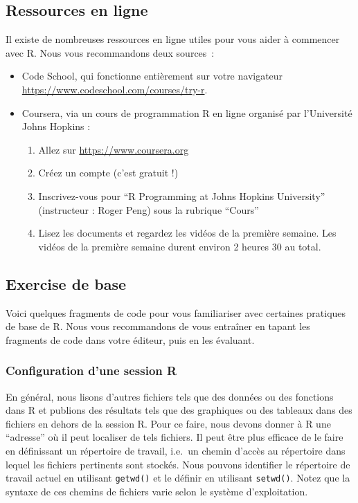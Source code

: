 \documentclass[
  12pt,
]{book}
\providecommand{\tightlist}{%
  \setlength{\itemsep}{0pt}\setlength{\parskip}{0pt}}
\begin{document}
\hypertarget{ressources-en-ligne}{%
\subsection{Ressources en ligne}\label{ressources-en-ligne}}

Il existe de nombreuses ressources en ligne utiles pour vous aider à commencer avec R. Nous vous recommandons deux sources~:

\begin{itemize}
\tightlist
\item
  Code School, qui fonctionne entièrement sur votre navigateur \url{https://www.codeschool.com/courses/try-r}.
\item
  Coursera, via un cours de programmation R en ligne organisé par l'Université Johns Hopkins :

  \begin{enumerate}
  \def\labelenumi{\roman{enumi}.}
  \tightlist
  \item
    Allez sur \url{https://www.coursera.org}
  \item
    Créez un compte (c'est gratuit !)
  \item
    Inscrivez-vous pour ``R Programming at Johns Hopkins University'' (instructeur : Roger Peng) sous la rubrique ``Cours''
  \item
    Lisez les documents et regardez les vidéos de la première semaine. Les vidéos de la première semaine durent environ 2 heures 30 au total.
  \end{enumerate}
\end{itemize}

\hypertarget{exercise-de-base}{%
\subsection{Exercise de base}\label{exercise-de-base}}

Voici quelques fragments de code pour vous familiariser avec certaines pratiques de base de R. Nous vous recommandons de vous entraîner en tapant les fragments de code dans votre éditeur, puis en les évaluant.

\hypertarget{configuration-dune-session-r}{%
\subsubsection{Configuration d'une session R}\label{configuration-dune-session-r}}

En général, nous lisons d'autres fichiers tels que des données ou des fonctions dans R et publions des résultats tels que des graphiques ou des tableaux dans des fichiers en dehors de la session R. Pour ce faire, nous devons donner à R une ``adresse'' où il peut localiser de tels fichiers. Il peut être plus efficace de le faire en définissant un répertoire de travail, i.e.~un chemin d'accès au répertoire dans lequel les fichiers pertinents sont stockés. Nous pouvons identifier le répertoire de travail actuel en utilisant \texttt{getwd()} et le définir en utilisant \texttt{setwd()}. Notez que la syntaxe de ces chemins de fichiers varie selon le système d'exploitation.
\end{document}
